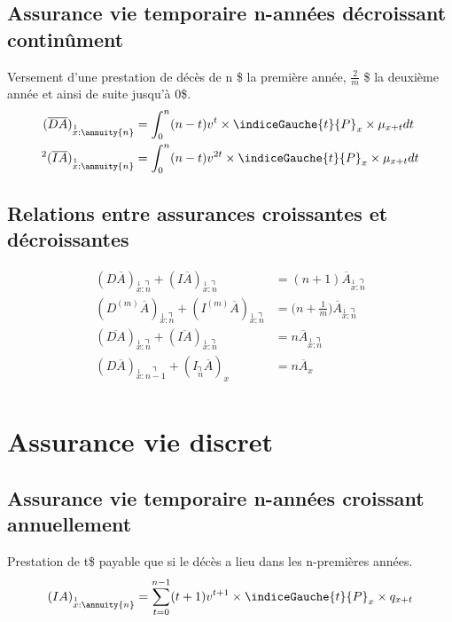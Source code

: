 \subsection{Assurance vie temporaire n-années décroissant continûment}
Versement d'une prestation de décès de n \$ la première année, $\frac{2}{m}$ \$ la deuxième année et ainsi de suite jusqu'à 0\$.
\begin{align*}
(\overline{DA})_{\overset{1}{x}:\annuity{n}} &= \int_{0}^{n} (n - t) v^t \times \indiceGauche{t}{P}_{x}\times \mu_{x+t}dt \\
{}^2(\overline{IA})_{\overset{1}{x}:\annuity{n}} &= \int_{0}^{n}(n - t) v^{2t} \times \indiceGauche{t}{P}_{x}\times \mu_{x+t}dt \\
\end{align*}

\subsection{Relations entre assurances croissantes et décroissantes}
\begin{align*}
(D\overline{A})_{\overset{1}{x}:\annuity{n}} + (I\overline{A})_{\overset{1}{x}:\annuity{n}} &= (n+1) \overline{A}_{\overset{1}{x}:\annuity{n}} \\
(D^{(m)}\overline{A})_{\overset{1}{x}:\annuity{n}} + (I^{(m)}\overline{A})_{\overset{1}{x}:\annuity{n}} &= \Big(n + \frac{1}{m} \Big) \overline{A}_{\overset{1}{x}:\annuity{n}} \\
(\overline{DA})_{\overset{1}{x}:\annuity{n}} + (\overline{IA})_{\overset{1}{x}:\annuity{n}} &= n \overline{A}_{\overset{1}{x}:\annuity{n}} \\
(D\overline{A})_{\overset{1}{x}:\annuity{n-1}} + (I_{\annuity{n}}\overline{A})_{x} &= n \overline{A}_{x} \\
\end{align*}

\section{Assurance vie discret}


\subsection{Assurance vie  temporaire n-années croissant annuellement}
Prestation de t\$ payable que si le décès a lieu dans les n-premières années.
\begin{align*}
(IA)_{\overset{1}{x}:\annuity{n}} &= \sum_{t=0}^{n-1}(t +1 )v^{t+1} \times \indiceGauche{t}{P}_{x} \times q_{x+t}\\
\end{align*}


